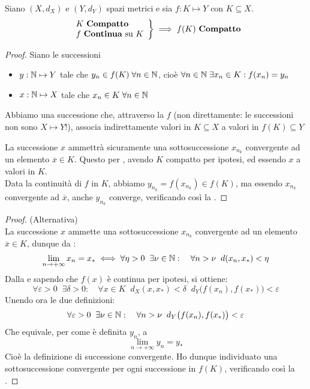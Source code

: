 \begin{theorem}
	\label{teo:weier_generale}
	Siano $(X,d_X)$ e $(Y,d_Y)$ spazi metrici e sia $f:K \mapsto Y$ con $K \subseteq X$.
	\begin{equation*}
		\left.
		\begin{array}{l}
		K \text{ \textbf{Compatto}} \\
		f \text{ \textbf{Continua} su } K
		\end{array}
		\right\} \implies
		f(K) \text{ \textbf{Compatto}}
	\end{equation*}
	\begin{proof}
		Siano le successioni
		\begin{itemize}
			\item $y: \mathbb{N} \mapsto Y$ tale che $y_n \in f(K) \;\forall n \in \mathbb{N}$, cioè $\forall n \in \mathbb{N}\;\exists x_n \in K: f(x_n) = y_n$
			\item $x: \mathbb{N} \mapsto X$ tale che $x_n \in K\;\forall n \in \mathbb{N}$
		\end{itemize}
		\begin{note}
			Abbiamo una successione che, attraverso la $f$ (non direttamente: le successioni non sono $X \mapsto Y$!), associa indirettamente valori in $K \subseteq X$ a valori in $f(K) \subseteq Y$
		\end{note}
		La successione $x$ ammettrà sicuramente una sottosuccessione $x_{n_k}$ convergente ad un elemento $\overline{x} \in K$. Questo per , avendo $K$ compatto per ipotesi, ed essendo $x$ a valori in $K$.\\
		Data la continuità di $f$ in $K$, abbiamo $y_{n_k} = f(x_{n_k}) \in f(K)$, ma essendo $x_{n_k}$ convergente ad $\overline{x}$, anche $y_{n_k}$ converge, verificando così la .
	\end{proof}
	\begin{proof} (Alternativa)\\
		La successione $x$ ammette una sottosuccessione $x_{n_k}$ convergente ad un elemento $\overline{x} \in K$, dunque da :
		\[\lim\limits_{n\rightarrow+\infty}x_n=x_*\iff\forall\eta > 0\;\;\exists\nu\in\mathbb{N}:\quad\forall n>\nu\;\;d(x_n,x_*)<\eta\]
		Dalla  e sapendo che $f(x)$ è continua per ipotesi, si ottiene:
		\[\forall\varepsilon > 0\;\;\exists\delta > 0:\quad\forall x \in K\;\;d_X (x,x_*)<\delta\;\;d_Y \bigl(f(x_n),f(x_*)\bigr)<\varepsilon\]
		Unendo ora le due definizioni:
		\[\forall \varepsilon > 0\;\;\exists \nu \in \mathbb{N}:\quad \forall n > \nu\;\;d_Y \bigl(f(x_n),f(x_*)\bigr)<\varepsilon\]
		Che equivale, per come è definita $y_n$, a
		\[\lim\limits_{n\rightarrow +\infty}y_n = y_*\]
		Cioè la definizione di successione convergente. Ho dunque individuato una sottosuccessione convergente per ogni successione in $f(K)$, verificando così la .
	\end{proof}
\end{theorem}
